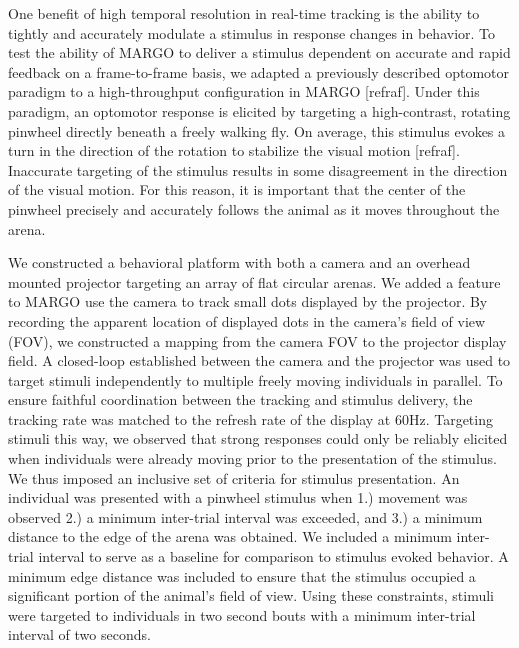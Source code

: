 \documentclass[10pt]{article}
\begin{document}
\begin{multicols}{2}
One benefit of high temporal resolution in real-time tracking is the ability to tightly and accurately modulate a stimulus in response changes in behavior. To test the ability of MARGO to deliver a stimulus dependent on accurate and rapid feedback on a frame-to-frame basis, we adapted a previously described optomotor paradigm to a high-throughput configuration in MARGO [refraf]. Under this paradigm, an optomotor response is elicited by targeting a high-contrast, rotating pinwheel directly beneath a freely walking fly. On average, this stimulus evokes a turn in the direction of the rotation to stabilize the visual motion [refraf]. Inaccurate targeting of the stimulus results in some disagreement in the direction of the visual motion. For this reason, it is important that the center of the pinwheel precisely and accurately follows the animal as it moves throughout the arena.

We constructed a behavioral platform with both a camera and an overhead mounted projector targeting an array of flat circular arenas. We added a feature to MARGO use the camera to track small dots displayed by the projector. By recording the apparent location of displayed dots in the camera's field of view (FOV), we constructed a mapping from the camera FOV to the projector display field. A closed-loop established between the camera and the projector was used to target stimuli independently to multiple freely moving individuals in parallel. To ensure faithful coordination between the tracking and stimulus delivery, the tracking rate was matched to the refresh rate of the display at 60Hz. Targeting stimuli this way, we observed that strong responses could only be reliably elicited when individuals were already moving prior to the presentation of the stimulus. We thus imposed an inclusive set of criteria for stimulus presentation. An individual was presented with a pinwheel stimulus when 1.) movement was observed 2.) a minimum inter-trial interval was exceeded, and 3.) a minimum distance to the edge of the arena was obtained. We included a minimum inter-trial interval to serve as a baseline for comparison to stimulus evoked behavior. A minimum edge distance was included to ensure that the stimulus occupied a significant portion of the animal's field of view. Using these constraints, stimuli were targeted to individuals in two second bouts with a minimum inter-trial interval of two seconds. 


\end{multicols}
\end{document}
